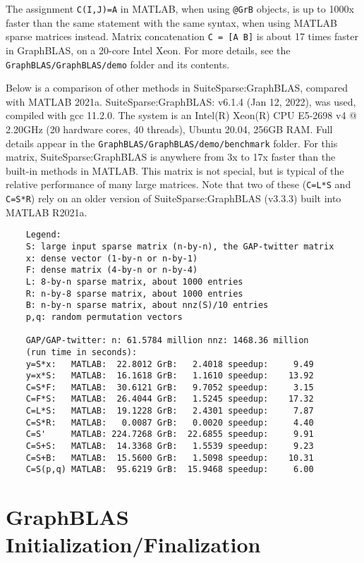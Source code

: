 \documentclass[12pt]{article}
\begin{document}
The assignment \verb'C(I,J)=A' in MATLAB, when using \verb'@GrB' objects, is up
to 1000x faster than the same statement with the same syntax, when using MATLAB
sparse matrices instead.  Matrix concatenation \verb'C = [A B]' is about 17
times faster in GraphBLAS, on a 20-core Intel Xeon.  For more details, see the
\verb'GraphBLAS/GraphBLAS/demo' folder and its contents.

Below is a comparison of other methods in SuiteSparse:GraphBLAS, compared with
MATLAB 2021a.  SuiteSparse:GraphBLAS: v6.1.4 (Jan 12, 2022), was used, compiled
with gcc 11.2.0.  The system is an Intel(R) Xeon(R) CPU E5-2698 v4 @ 2.20GHz
(20 hardware cores, 40 threads), Ubuntu 20.04, 256GB RAM.  Full details appear
in the \verb'GraphBLAS/GraphBLAS/demo/benchmark' folder.  For this matrix,
SuiteSparse:GraphBLAS is anywhere from 3x to 17x faster than the built-in
methods in MATLAB.  This matrix is not special, but is typical of the relative
performance of many large matrices.  Note that two of these (\verb'C=L*S' and
\verb'C=S*R') rely on an older version of SuiteSparse:GraphBLAS (v3.3.3) built
into MATLAB R2021a.

{\footnotesize
\begin{verbatim}
    Legend:
    S: large input sparse matrix (n-by-n), the GAP-twitter matrix
    x: dense vector (1-by-n or n-by-1)
    F: dense matrix (4-by-n or n-by-4)
    L: 8-by-n sparse matrix, about 1000 entries
    R: n-by-8 sparse matrix, about 1000 entries
    B: n-by-n sparse matrix, about nnz(S)/10 entries
    p,q: random permutation vectors

    GAP/GAP-twitter: n: 61.5784 million nnz: 1468.36 million
    (run time in seconds):
    y=S*x:   MATLAB:  22.8012 GrB:   2.4018 speedup:     9.49
    y=x*S:   MATLAB:  16.1618 GrB:   1.1610 speedup:    13.92
    C=S*F:   MATLAB:  30.6121 GrB:   9.7052 speedup:     3.15
    C=F*S:   MATLAB:  26.4044 GrB:   1.5245 speedup:    17.32
    C=L*S:   MATLAB:  19.1228 GrB:   2.4301 speedup:     7.87
    C=S*R:   MATLAB:   0.0087 GrB:   0.0020 speedup:     4.40
    C=S'     MATLAB: 224.7268 GrB:  22.6855 speedup:     9.91
    C=S+S:   MATLAB:  14.3368 GrB:   1.5539 speedup:     9.23
    C=S+B:   MATLAB:  15.5600 GrB:   1.5098 speedup:    10.31
    C=S(p,q) MATLAB:  95.6219 GrB:  15.9468 speedup:     6.00    \end{verbatim}
}

\newpage
\section{GraphBLAS Initialization/Finalization} %
\label{init_and_fini}
\end{document}
